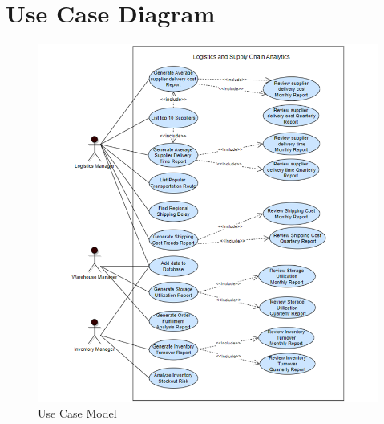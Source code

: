 	\section{Use Case Diagram}
\begin{figure}[h]
	\centering
	\includegraphics[width=1\textwidth]{UML.png} 
	\caption{Use Case Model}
	\label{fig:Use Case Model}
\end{figure}

